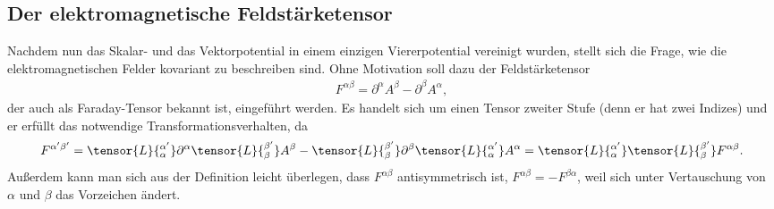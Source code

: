 \subsection{Der elektromagnetische Feldstärketensor}

Nachdem nun das Skalar- und das Vektorpotential in einem einzigen Viererpotential vereinigt wurden, stellt sich die Frage, wie die elektromagnetischen Felder kovariant zu beschreiben sind.
Ohne Motivation soll dazu der Feldstärketensor
\begin{align}
    \boxed{F^{\alpha\beta} = \partial^\alpha A^\beta -\partial^\beta A^\alpha,}
\end{align}
der auch als Faraday-Tensor bekannt ist, eingeführt werden.
Es handelt sich um einen Tensor zweiter Stufe (denn er hat zwei Indizes) und er erfüllt das notwendige Transformationsverhalten, da
\begin{align}
    \label{eq:trafo_feldstaerketensor}
    F^{\alpha'\beta'} =  \tensor{L}{^{\alpha'}_{\alpha}}\partial^{\alpha} \tensor{L}{^{\beta'}_{\beta}}A^{\beta} -\tensor{L}{^{\beta'}_{\beta}}\partial^\beta \tensor{L}{^{\alpha'}_{\alpha}}A^\alpha = \tensor{L}{^{\alpha'}_{\alpha}}\tensor{L}{^{\beta'}_{\beta}} F^{\alpha\beta}.
\end{align}
Außerdem kann man sich aus der Definition leicht überlegen, dass $F^{\alpha\beta}$ antisymmetrisch ist, $F^{\alpha\beta}=-F^{\beta\alpha}$, weil sich unter Vertauschung von $\alpha$ und $\beta$ das Vorzeichen ändert.

